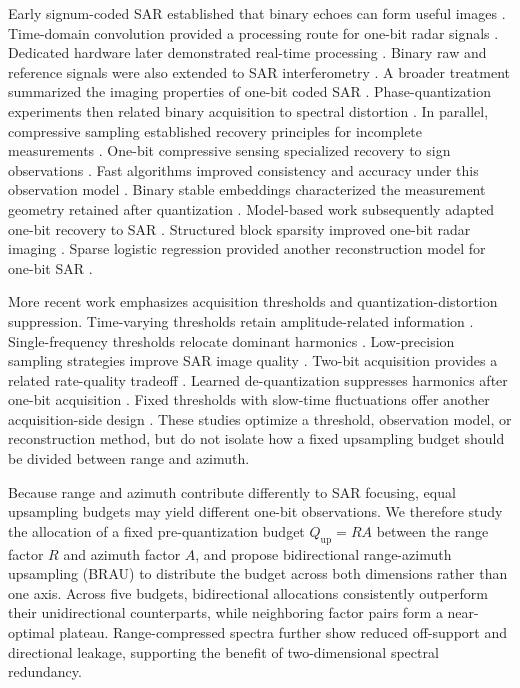 \documentclass[conference]{IEEEtran}
\begin{document}
Early signum-coded SAR established that binary echoes can form useful images \cite{franceschetti1991signum}. Time-domain convolution provided a processing route for one-bit radar signals \cite{alberti1991time}. Dedicated hardware later demonstrated real-time processing \cite{cappuccino1996processor}. Binary raw and reference signals were also extended to SAR interferometry \cite{fornaro1997interferometry}. A broader treatment summarized the imaging properties of one-bit coded SAR \cite{pascazio1998onebit}. Phase-quantization experiments then related binary acquisition to spectral distortion \cite{franceschetti1999phase}. In parallel, compressive sampling established recovery principles for incomplete measurements \cite{candes2008intro}. One-bit compressive sensing specialized recovery to sign observations \cite{boufounos2008onebit}. Fast algorithms improved consistency and accuracy under this observation model \cite{laska2011trust}. Binary stable embeddings characterized the measurement geometry retained after quantization \cite{jacques2013robust}. Model-based work subsequently adapted one-bit recovery to SAR \cite{dong2015map}. Structured block sparsity improved one-bit radar imaging \cite{wang2019enhanced}. Sparse logistic regression provided another reconstruction model for one-bit SAR \cite{ge2023sparse}.

More recent work emphasizes acquisition thresholds and quantization-distortion suppression. Time-varying thresholds retain amplitude-related information \cite{demir2018onebit}. Single-frequency thresholds relocate dominant harmonics \cite{zhao2019onebit}. Low-precision sampling strategies improve SAR image quality \cite{zhao2021lowprecision}. Two-bit acquisition provides a related rate-quality tradeoff \cite{liu2023twobit}. Learned de-quantization suppresses harmonics after one-bit acquisition \cite{si2023dequantization}. Fixed thresholds with slow-time fluctuations offer another acquisition-side design \cite{nie2025fixed}. These studies optimize a threshold, observation model, or reconstruction method, but do not isolate how a fixed upsampling budget should be divided between range and azimuth.

Because range and azimuth contribute differently to SAR focusing, equal upsampling budgets may yield different one-bit observations. We therefore study the allocation of a fixed pre-quantization budget $Q_{\mathrm{up}}=RA$ between the range factor $R$ and azimuth factor $A$, and propose bidirectional range-azimuth upsampling (BRAU) to distribute the budget across both dimensions rather than one axis. Across five budgets, bidirectional allocations consistently outperform their unidirectional counterparts, while neighboring factor pairs form a near-optimal plateau. Range-compressed spectra further show reduced off-support and directional leakage, supporting the benefit of two-dimensional spectral redundancy.
\end{document}
